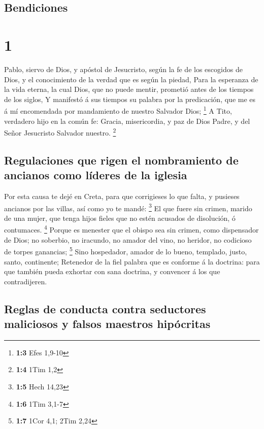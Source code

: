 \hypertarget{bendiciones}{%
\subsection{Bendiciones}\label{bendiciones}}

\hypertarget{section}{%
\section{1}\label{section}}

 Pablo, siervo de Dios, y apóstol de Jesucristo, según la
fe de los escogidos de Dios, y el conocimiento de la verdad que es según
la piedad,  Para la esperanza de la vida eterna, la cual
Dios, que no puede mentir, prometió antes de los tiempos de los siglos,
 Y manifestó á sus tiempos su palabra por la predicación,
que me es á mí encomendada por mandamiento de nuestro Salvador Dios;
\footnote{\textbf{1:3} Efes 1,9-10}  A Tito, verdadero
hijo en la común fe: Gracia, misericordia, y paz de Dios Padre, y del
Señor Jesucristo Salvador nuestro. \footnote{\textbf{1:4} 1Tim 1,2}

\hypertarget{regulaciones-que-rigen-el-nombramiento-de-ancianos-como-luxedderes-de-la-iglesia}{%
\subsection{Regulaciones que rigen el nombramiento de ancianos como
líderes de la
iglesia}\label{regulaciones-que-rigen-el-nombramiento-de-ancianos-como-luxedderes-de-la-iglesia}}

 Por esta causa te dejé en Creta, para que corrigieses lo
que falta, y pusieses ancianos por las villas, así como yo te mandé:
\footnote{\textbf{1:5} Hech 14,23}  El que fuere sin
crimen, marido de una mujer, que tenga hijos fieles que no estén
acusados de disolución, ó contumaces. \footnote{\textbf{1:6} 1Tim 3,1-7}
 Porque es menester que el obispo sea sin crimen, como
dispensador de Dios; no soberbio, no iracundo, no amador del vino, no
heridor, no codicioso de torpes ganancias; \footnote{\textbf{1:7} 1Cor
  4,1; 2Tim 2,24}  Sino hospedador, amador de lo bueno,
templado, justo, santo, continente;  Retenedor de la fiel
palabra que es conforme á la doctrina: para que también pueda exhortar
con sana doctrina, y convencer á los que contradijeren.

\hypertarget{reglas-de-conducta-contra-seductores-maliciosos-y-falsos-maestros-hipuxf3critas}{%
\subsection{Reglas de conducta contra seductores maliciosos y falsos
maestros
hipócritas}\label{reglas-de-conducta-contra-seductores-maliciosos-y-falsos-maestros-hipuxf3critas}}

